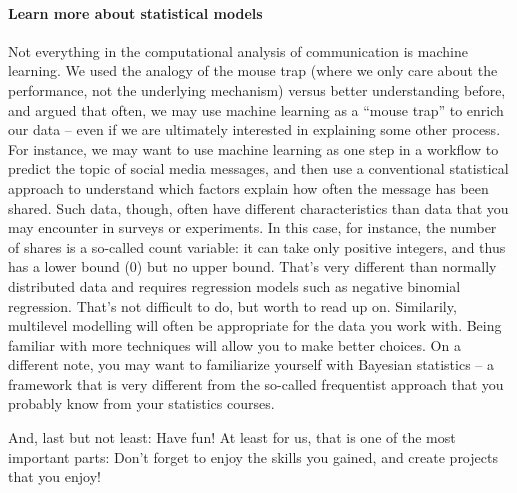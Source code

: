 \paragraph{Learn more about statistical models} Not everything in the computational analysis of communication is machine learning. We used the analogy of the mouse trap (where we only care about the performance, not the underlying mechanism) versus better understanding before, and argued that often, we may use machine learning as a ``mouse trap'' to enrich our data -- even if we are ultimately interested in explaining some other process. For instance, we may want to use machine learning as one step in a workflow to predict the topic of social media messages, and then use a conventional statistical approach to understand which factors explain how often the message has been shared. Such data, though, often have different characteristics than data that you may encounter in surveys or experiments. In this case, for instance, the number of shares is a so-called count variable: it can take only positive integers, and thus has a lower bound (0) but no upper bound. That's very different than normally distributed data and requires regression models such as negative binomial regression. That's not difficult to do, but worth to read up on. Similarily, multilevel modelling will often be appropriate for the data you work with. Being familiar with more techniques will allow you to make better choices. On a different note, you may want to familiarize yourself with Bayesian statistics -- a framework that is very different from the so-called frequentist approach that you probably know from your statistics courses.


And, last but not least: Have fun! At least for us, that is one of the most important parts: Don't forget to enjoy the skills you gained, and create projects that you enjoy!
